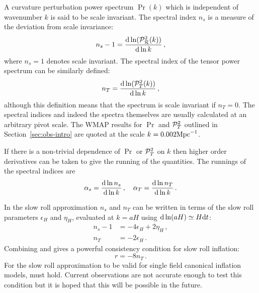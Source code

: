 A curvature perturbation power spectrum $\Pr(k)$ which is independent of
wavenumber $k$ is said to be scale invariant. The spectral index $n_s$ is a
measure of the deviation from scale invariance:
% 
\begin{equation}
\label{eq:nsdefn-intro}
 n_s -1 = \frac{\mathrm{d} \ln (\mathcal{P}_{\mathcal{R}}^2 (k))}{\mathrm{d} \ln k}\,,
\end{equation}
% 
where $n_s=1$ denotes scale invariant. The spectral index of
the tensor power spectrum can be similarly defined:
% 
\begin{equation}
\label{eq:ntdefn-intro}
 n_T = \frac{\mathrm{d} \ln(\mathcal{P}_T^2(k))}{\mathrm{d} \ln k}\,,
\end{equation}
although this definition means that the spectrum is scale invariant if
$n_T=0$.
The spectral indices and indeed the spectra themselves are usually calculated
at an arbitrary pivot scale. The WMAP results for $\Pr$ and $\mathcal{P}_T^2$ outlined in
Section~\ref{sec:obs-intro} are quoted at the scale $k=0.002\mathrm{Mpc}^{-1}$.


If there is a non-trivial dependence of $\Pr$ or $\mathcal{P}_T^2$ on $k$ then higher order
derivatives can be taken to give the running of the quantities. The runnings
of the spectral indices are
% 
\begin{equation}
\label{eq:runningsdefn-intro}
 \alpha_s = \frac{\mathrm{d} \ln n_s}{\mathrm{d} \ln k}\,, \quad 
  \alpha_T = \frac{\mathrm{d} \ln n_T}{\mathrm{d} \ln k}\,.
\end{equation}

In the slow roll approximation $n_s$ and $n_T$ can be written in terms of the slow
roll parameters $\epsilon_H$ and $\eta_H$, evaluated at $k=aH$ using $\mathrm{d} \ln(aH)
\simeq H\mathrm{d} t$:
% 
\begin{align}
 n_s -1 &= -4\epsilon_H + 2\eta_H\,, \\
 n_T &= -2\epsilon_H \label{eq:ntslowroll-intro}\,.
\end{align}
% 
Combining  and  gives a
powerful consistency condition for slow roll inflation:
% 
\begin{equation}
 \label{eq:consistency-intro}
 r = -8 n_T \,.
\end{equation}
% 
For the slow roll approximation to be valid for single field canonical inflation
models,  must hold. Current observations are not accurate
enough to test this condition but it is hoped that this will be possible in the
future.


